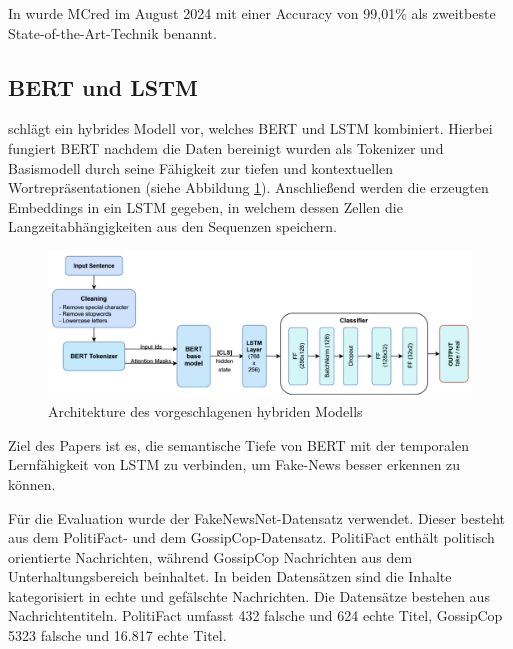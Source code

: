 In \cite{Dhiman:2024aa} wurde MCred im August 2024 mit einer Accuracy von 99,01\% als zweitbeste State-of-the-Art-Technik benannt.

\subsection{BERT und LSTM}

\cite{RAI202298} schlägt ein hybrides Modell vor, welches BERT und LSTM kombiniert. Hierbei fungiert BERT nachdem die Daten bereinigt wurden als Tokenizer und
Basismodell durch seine Fähigkeit zur tiefen und kontextuellen Wortrepräsentationen (siehe Abbildung \ref{fig:bert_lstm_architecture}). 
Anschließend werden die erzeugten Embeddings in ein LSTM gegeben, in welchem dessen Zellen die Langzeitabhängigkeiten aus den Sequenzen speichern.

\begin{figure}[htbp]
    \begin{center}
    \includegraphics[width=\linewidth]{static/bert_lstm_architecture.png}
    \caption{\label{fig:bert_lstm_architecture} Architekture des vorgeschlagenen hybriden Modells  \cite{RAI202298}}
    \end{center}
\end{figure}

Ziel des Papers ist es, die semantische Tiefe von BERT mit der temporalen Lernfähigkeit von LSTM zu verbinden, um Fake-News besser erkennen zu können.

Für die Evaluation wurde der FakeNewsNet-Datensatz verwendet. Dieser besteht aus dem PolitiFact- und dem GossipCop-Datensatz. 
PolitiFact enthält politisch orientierte Nachrichten, während GossipCop Nachrichten aus dem Unterhaltungsbereich beinhaltet. 
In beiden Datensätzen sind die Inhalte kategorisiert in echte und gefälschte Nachrichten. 
Die Datensätze bestehen aus Nachrichtentiteln. PolitiFact umfasst 432 falsche und 624 echte Titel, GossipCop 5323 falsche und 16.817 echte Titel.

